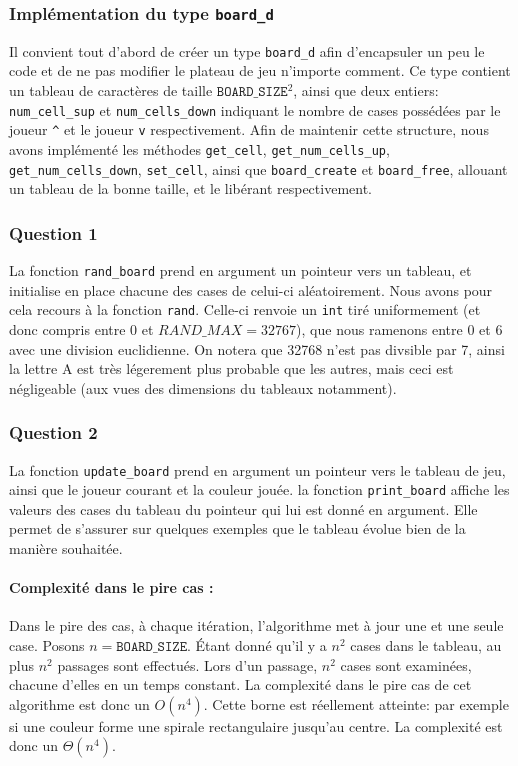 \documentclass[12pt,a4paper,twoside]{article}
\begin{document}
\subsubsection*{Implémentation du type \texttt{board\_d}}
Il convient tout d'abord de créer un type \texttt{board\_d} afin
d'encapsuler un peu le code et de ne pas modifier le plateau de jeu
n'importe comment. Ce type contient un tableau de caractères de taille
\(\texttt{BOARD\_SIZE} ^{2}\), ainsi que deux entiers:
\texttt{num\_cell\_sup} et \texttt{num\_cells\_down} indiquant le nombre de
cases possédées par le joueur \texttt{\^} et le joueur \texttt{v} respectivement.
Afin de maintenir cette structure, nous avons implémenté les
méthodes \texttt{get\_cell}, \texttt{get\_num\_cells\_up},
\texttt{get\_num\_cells\_down}, \texttt{set\_cell}, ainsi que
\texttt{board\_create} et \texttt{board\_free}, allouant un tableau de
la bonne taille, et le libérant respectivement. 
\subsubsection*{Question 1}
\label{sec:orgheadline2}
La fonction \texttt{rand\_board} prend en argument un pointeur vers un
tableau, et initialise en place chacune des cases de celui-ci
aléatoirement.  Nous avons pour cela recours à la fonction
\texttt{rand}. Celle-ci renvoie un \texttt{int} tiré uniformement (et
donc compris entre \(0\)
et \(RAND\_MAX = 32767\)),
que nous ramenons entre 0 et 6 avec une division euclidienne. On
notera que 32768 n'est pas divsible par 7, ainsi la lettre A est très
légerement plus probable que les autres, mais ceci est négligeable
(aux vues des dimensions du tableaux notamment).
\subsubsection*{Question 2}
\label{sec:orgheadline5}
La fonction \texttt{update\_board} prend en argument un pointeur vers
le tableau de jeu, ainsi que le joueur courant et la couleur jouée.
la fonction \texttt{print\_board} affiche les valeurs des cases du
tableau du pointeur qui lui est donné en argument. Elle permet de
s'assurer sur quelques exemples que le tableau évolue bien de la
manière souhaitée. 
\paragraph*{Complexité dans le pire cas :}
\label{sec:orgheadline3}
Dans le pire des cas, à chaque itération, l'algorithme met à jour une
et une seule case. Posons \(n = \texttt{BOARD\_SIZE}\). Étant donné qu'il y a \(n^{2}\)
cases dans le tableau, au plus \(n^{2}\) passages sont effectués. Lors d'un
passage, \(n^{2}\) cases sont examinées, chacune d'elles en un temps
constant. La complexité dans le pire cas de cet algorithme est donc un
\(O(n^4)\).
Cette borne est réellement atteinte: par exemple si une couleur forme
une spirale rectangulaire jusqu'au centre. La complexité est donc un
\(\Theta(n^{4})\). 
\end{document}
